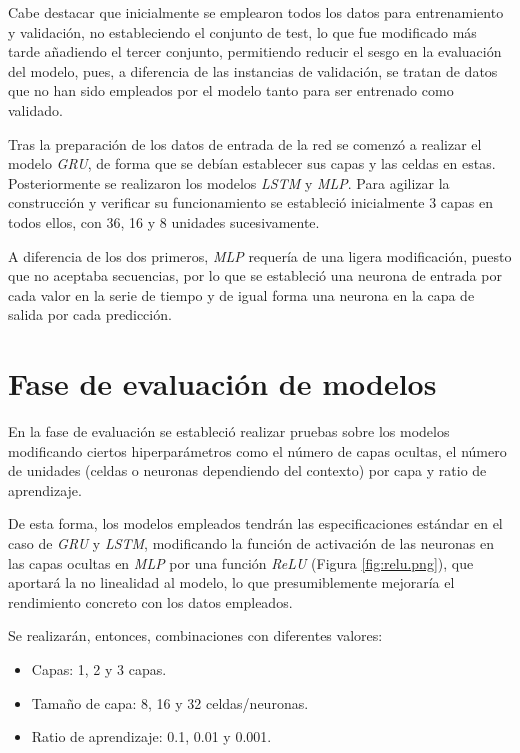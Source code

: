 
Cabe destacar que inicialmente se emplearon todos los datos para entrenamiento y validación, no estableciendo
el conjunto de test, lo que fue modificado más tarde añadiendo el tercer conjunto, permitiendo reducir el sesgo en 
la evaluación del modelo, pues, a diferencia de las instancias de validación, se tratan
de datos que no han sido empleados por el modelo tanto para ser entrenado como validado.

Tras la preparación de los datos de entrada de la red se comenzó a realizar el modelo \textit{GRU}, de forma
que se debían establecer sus capas y las celdas en estas. Posteriormente se realizaron los modelos
\textit{LSTM} y \textit{MLP}.
Para agilizar la construcción y verificar su funcionamiento se estableció inicialmente 3 capas en todos ellos, con
36, 16 y 8 unidades sucesivamente.

A diferencia de los dos primeros, \textit{MLP} requería de una ligera modificación, puesto que no aceptaba secuencias, 
por lo que se estableció una neurona de entrada por cada valor en la serie de tiempo y de igual forma una 
neurona en la capa de salida por cada predicción. 

\section{Fase de evaluación de modelos}
En la fase de evaluación se estableció realizar pruebas sobre los modelos modificando ciertos hiperparámetros como 
el número de capas ocultas, el número de unidades (celdas o neuronas dependiendo del contexto) por capa y
ratio de aprendizaje.

De esta forma, los modelos empleados tendrán las especificaciones estándar en el caso de
\textit{GRU} y \textit{LSTM}, modificando la función de activación de las neuronas en las capas ocultas en 
\textit{MLP} por una función \textit{ReLU} (Figura \ref{fig:relu.png}), que aportará la no linealidad al modelo, lo que presumiblemente
mejoraría el rendimiento concreto con los datos empleados.


Se realizarán, entonces, combinaciones con diferentes valores:
\begin{itemize}
    \item Capas: 1, 2 y 3 capas.
    \item Tamaño de capa: 8, 16 y 32 celdas/neuronas.
    \item Ratio de aprendizaje: 0.1, 0.01 y 0.001.
\end{itemize}
